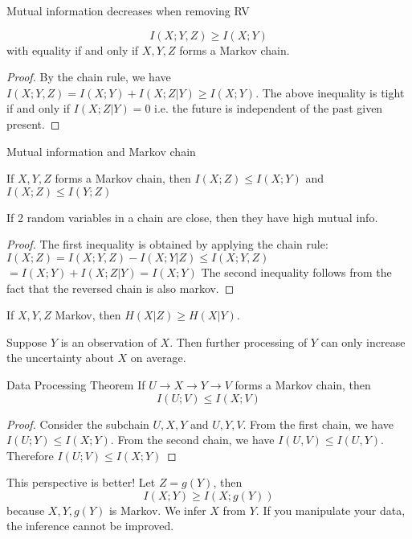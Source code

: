 \documentclass[../main.tex]{subfiles}
\begin{document}
\begin{bbox}{Mutual information decreases when removing RV}
    \begin{theorem}
        \begin{equation*}
            I(X;Y,Z)\geq I(X;Y)
        \end{equation*} 
        with equality if and only if $X,Y,Z$ forms a Markov chain.
    \end{theorem}
    \begin{proof}
        By the chain rule, we have $I(X;Y,Z)=I(X;Y) + I(X;Z|Y) \geq I(X;Y)$. The above inequality is tight if and only if $I(X;Z|Y)=0$ i.e. the future is independent of the past given present.
    \end{proof}
\end{bbox}

\begin{bbox}{Mutual information and Markov chain}
    \begin{lemma}
        If $X,Y,Z$ forms a Markov chain, then $I(X;Z)\leq I(X;Y)$ and $I(X;Z)\leq I(Y;Z)$
    \end{lemma}
    If 2 random variables in a chain are close, then they have high mutual info.
    \begin{proof}
        The first inequality is obtained by applying the chain rule: $I(X;Z) = I(X;Y,Z)-I(X;Y|Z)\leq I(X;Y,Z)$\\
        $=I(X;Y)+I(X;Z|Y) = I(X;Y)$
    The second inequality follows from the fact that the reversed chain is also markov.
    \end{proof}
    \begin{corollary*}
        If $X,Y,Z$ Markov, then $H(X|Z)\geq H(X|Y)$.
    \end{corollary*}
    Suppose $Y$ is an observation of $X$. Then further processing of $Y$ can only increase the uncertainty about $X$ on average.
\end{bbox}
\begin{bbox}{Data Processing Theorem}
    If $U\to X\to Y\to V$ forms a Markov chain, then \begin{equation*}
        I(U;V)\leq I(X;V)
    \end{equation*}
    \begin{proof}
        Consider the subchain $U,X,Y$ and $U,Y,V$.
        From the first chain, we have $I(U;Y)\leq I(X;Y)$. From the second chain, we have $I(U,V)\leq I(U,Y)$.\\
        Therefore $I(U;V)\leq I(X;Y)$
    \end{proof}
\end{bbox}
\begin{pbox}{This perspective is better!}
    Let $Z=g(Y)$, then \begin{equation*}
        I(X;Y) \geq I(X;g(Y))
    \end{equation*}
    because $X,Y,g(Y)$ is Markov. We infer $X$ from $Y$. If you manipulate your data, the inference cannot be improved.
\end{pbox}
\end{document}
